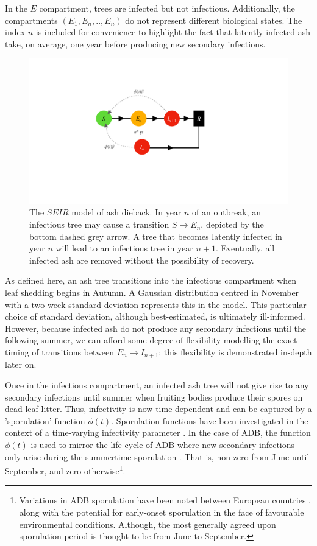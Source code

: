 In the $E$ compartment, trees are infected but not infectious. Additionally, the compartments $(E_1, E_n,..,E_n)$ do not represent different biological states. The index $n$ is included for convenience to highlight the fact that latently infected ash take, on average, one year before producing new secondary infections.

\begin{figure}
    \centering
    \includegraphics[scale=0.30]{chapter6/figures/fig1.pdf}
    \caption{The $SEIR$ model of ash dieback. In year $n$ of an outbreak, an infectious tree may cause a transition $S\rightarrow E_n$, depicted by the bottom dashed grey arrow. A tree that becomes latently infected in year $n$ will lead to an infectious tree in year $n+1$. Eventually, all infected ash are removed without the possibility of recovery.}
    \label{fig:SEIR-transitions}
\end{figure}

As defined here, an ash tree transitions into the infectious compartment when leaf shedding begins in Autumn. A Gaussian distribution centred in November with a two-week standard deviation represents this in the model. This particular choice of standard deviation, although best-estimated, is ultimately ill-informed. However, because infected ash do not produce any secondary infections until the following summer, we can afford some degree of flexibility modelling the exact timing of transitions between $E_{n}\rightarrow I_{n+1}$; this flexibility is demonstrated in-depth later on.

Once in the infectious compartment, an infected ash tree will not give rise to any secondary infections until summer when fruiting bodies produce their spores on dead leaf litter. Thus, infectivity is now time-dependent and can be captured by a 'sporulation' function $\phi(t)$. Sporulation functions have been investigated in the context of a time-varying infectivity parameter \cite{time-varying-infectivity}. In the case of ADB, the function $\phi(t)$ is used to mirror the life cycle of ADB where new secondary infections only arise during the summertime sporulation \cite{https://doi.org/10.1111/mpp.12073}. That is, non-zero from June until September, and zero otherwise\footnote{Variations in ADB sporulation have been noted between European countries \cite{https://doi.org/10.1111/mpp.12073}, along with the potential for early-onset sporulation in the face of favourable environmental conditions. Although, the most generally agreed upon sporulation period is thought to be from June to September.}.

